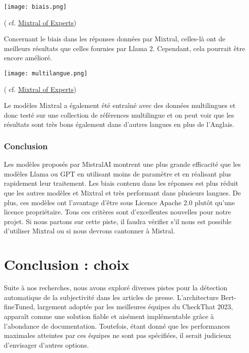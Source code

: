 \documentclass[11pt]{rapport_class}
\begin{document}
\vspace{5mm}

\begin{center}
    \texttt{[image: biais.png]}\\
    \begin{tiny}
         ( cf. \href{https://arxiv.org/pdf/2401.04088v1.pdf}{Mixtral of Experts})\\
    \end{tiny} 
\end{center}
Concernant le biais dans les réponses données par Mixtral, celles-là ont de meilleurs résultats que celles fournies par Llama 2. Cependant, cela pourrait être encore amélioré.
\vspace{10mm}

\begin{center}
\texttt{[image: multilangue.png]}\\
    \begin{tiny}
       ( cf. \href{https://arxiv.org/pdf/2401.04088v1.pdf}{Mixtral of Experts})\\
    \end{tiny} 
\end{center}


\qquad Le modèles Mixtral a également été entraîné avec des données multilingues et donc testé sur une collection de références multilingue et on peut voir que les résultats sont très bons également dans d’autres langues en plus de l’Anglais.

\subsection{Conclusion}
\qquad Les modèles proposés par MistralAI montrent une plus grande efficacité que les modèles Llama ou GPT en utilisant moins de paramètre et en réalisant plus rapidement leur traitement. Les biais contenu dans les réponses est plus réduit que les autres modèles et Mixtral et très performant dans plusieurs langues. De plus, ces modèles ont l'avantage d’être sous Licence Apache 2.0 plutôt qu’une licence propriétaire. Tous ces critères sont d'excellentes nouvelles pour notre projet. Si nous partons sur cette piste, il faudra vérifier s'il nous est possible d'utiliser Mixtral ou si nous devrons cantonner à Mistral.



\chapter{Conclusion : choix}
\qquad Suite à nos recherches, nous avons exploré diverses pistes pour la détection automatique de la subjectivité dans les articles de presse. L'architecture Bert-fineTuned, largement adoptée par les meilleures équipes du CheckThat 2023, apparaît comme une solution fiable et aisément implémentable grâce à l'abondance de documentation. Toutefois, étant donné que les performances maximales atteintes par ces équipes ne sont pas spécifiées, il serait judicieux d'envisager d'autres options.
\end{document}

